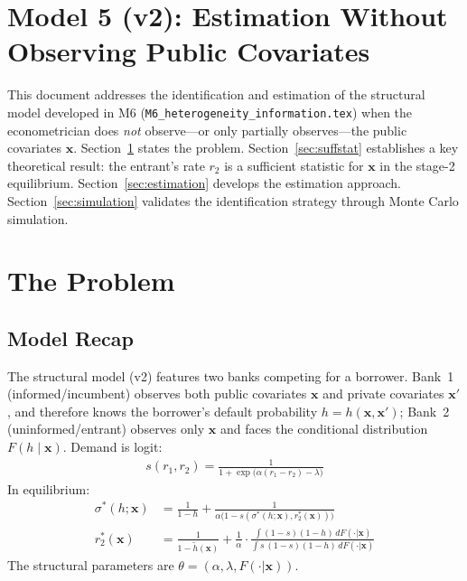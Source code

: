 \documentclass[12pt]{article}
\theoremstyle{plain}
\theoremstyle{plain}
\theoremstyle{definition}  %
\theoremstyle{remark}  %
\begin{document}
\section*{Model 5 (v2): Estimation Without Observing Public Covariates}

This document addresses the identification and estimation of the structural model developed in M6 (\texttt{M6\_heterogeneity\_information.tex}) when the econometrician does \emph{not} observe---or only partially observes---the public covariates $\mathbf{x}$. Section~\ref{sec:problem} states the problem. Section~\ref{sec:suffstat} establishes a key theoretical result: the entrant's rate $r_2$ is a sufficient statistic for $\mathbf{x}$ in the stage-2 equilibrium. Section~\ref{sec:estimation} develops the estimation approach. Section~\ref{sec:simulation} validates the identification strategy through Monte Carlo simulation.



\section{The Problem}\label{sec:problem}

\subsection{Model Recap}

The structural model (v2) features two banks competing for a borrower. Bank~1 (informed/incumbent) observes both public covariates $\mathbf{x}$ and private covariates $\mathbf{x}'$, and therefore knows the borrower's default probability $h = h(\mathbf{x}, \mathbf{x}')$; Bank~2 (uninformed/entrant) observes only $\mathbf{x}$ and faces the conditional distribution $F(h \mid \mathbf{x})$. Demand is logit:
\begin{align}\label{eq:share}
    s(r_1, r_2) = \frac{1}{1 + \exp\!\big(\alpha(r_1 - r_2) - \lambda\big)}
\end{align}
In equilibrium:
\begin{align}
    \sigma^*(h;\mathbf{x}) &= \frac{1}{1-h} + \frac{1}{\alpha\big(1-s(\sigma^*(h;\mathbf{x}), r_2^*(\mathbf{x}))\big)} \label{eq:sigma}\\[4pt]
    r_2^*(\mathbf{x}) &= \frac{1}{1 - \tilde{h}(\mathbf{x})} + \frac{1}{\alpha}\cdot\frac{\int (1-s)(1-h)\, dF(\cdot|\mathbf{x})}{\int s\,(1-s)(1-h)\, dF(\cdot|\mathbf{x})} \label{eq:r2}
\end{align}
The structural parameters are $\theta = (\alpha, \lambda, F(\cdot|\mathbf{x}))$.
\end{document}
